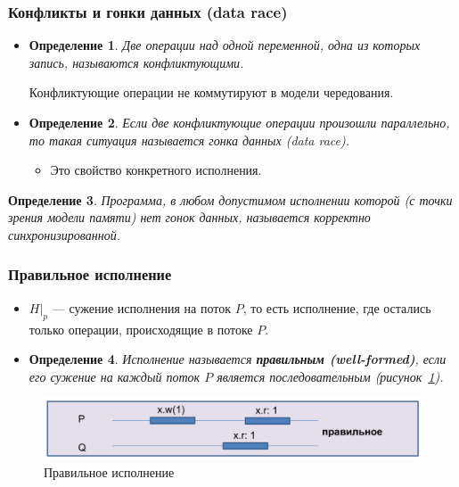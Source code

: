 \documentclass[10pt,a4paper,oneside,titlepage]{article}
\theoremstyle{plain}
\theoremstyle{defenition}
\newtheorem*{defenition}{Определение}
\begin{document}
\subsubsection{Конфликты и гонки данных (data race)}
\begin{itemize}
	\item \begin{defenition}
		Две операции над одной переменной, одна из которых запись, называются конфликтующими.
	\end{defenition}
    Конфликтующие операции не коммутируют в модели чередования.
	\item \begin{defenition}
		Если две конфликтующие операции произошли параллельно, то такая ситуация называется гонка данных (data race).
	\end{defenition} 
	\begin{itemize}
		\item Это свойство конкретного исполнения.
	\end{itemize}
\end{itemize}

\begin{defenition}
	Программа, в любом допустимом исполнении которой (с точки зрения модели памяти) нет гонок данных, называется корректно синхронизированной.
\end{defenition}

\subsubsection{Правильное исполнение} 
\begin{itemize}
	\item $H|_p$ --- сужение исполнения на поток $P$, то есть исполнение, где остались только операции, происходящие в потоке $P$.
	\item \begin{defenition}
		Исполнение называется {\bfseries правильным (well-formed)}, если его сужение на каждый поток $P$ является последовательным (рисунок~\ref{fig:model6}).
	\end{defenition} 
\end{itemize}
\begin{figure}
	\centering
	\includegraphics[width=0.5\linewidth]{pictures/Model6}
	\caption{Правильное исполнение}
	\label{fig:model6}
\end{figure}
\end{document}

